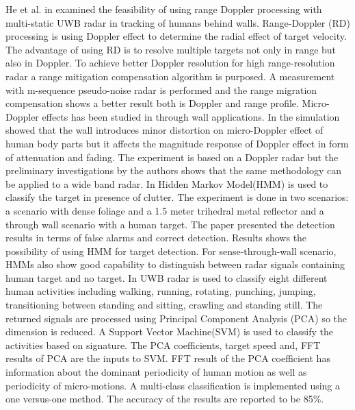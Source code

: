 He et al. in \cite{RangeDopplerHe} examined the feasibility of using range Doppler processing with multi-static UWB radar in tracking of humans behind walls. Range-Doppler (RD) processing is using Doppler effect to determine the radial effect of target velocity. The advantage of using RD is to resolve multiple targets not only in range but also in Doppler. To achieve better Doppler resolution for high range-resolution radar a range mitigation compensation algorithm is purposed. A measurement with m-sequence pseudo-noise radar is performed and the range migration compensation shows a better result both is Doppler and range profile.
\newline
Micro-Doppler effects has been studied in through wall applications. In \cite{RamMicrodopplerThroughWall} the simulation showed that the wall introduces minor distortion on micro-Doppler effect of human body parts but it affects the magnitude response of Doppler effect in form of attenuation and fading. The experiment is based on a Doppler radar but the preliminary investigations by the authors shows that the same methodology can be applied to a wide band radar. 
\newline
 In \cite{ZhaoHMM} Hidden Markov Model(HMM) is used to classify the target in presence of clutter. The experiment is done in two scenarios: a scenario with dense foliage and a 1.5 meter trihedral metal reflector and a through wall scenario with a human target. The paper presented the detection results in terms of false alarms and correct detection. Results shows the possibility of using HMM for target detection. For sense-through-wall scenario, HMMs also show good capability to distinguish between radar signals containing human target and no target. 
 \newline
 In \cite{BryanClassification} UWB radar is used to classify eight different human activities including walking, running, rotating, punching, jumping, transitioning between standing and sitting, crawling and standing still. The returned signals are processed using Principal Component Analysis (PCA) so the dimension is reduced. A Support Vector Machine(SVM) is used to classify the activities based on signature. The PCA coefficients, target speed and, FFT results of PCA are the inputs to SVM. FFT result of the PCA coefficient has information about the dominant periodicity of human motion as well as periodicity of micro-motions. A multi-class classification is implemented using a one versus-one method. The accuracy of the results are reported to be 85\%. 
